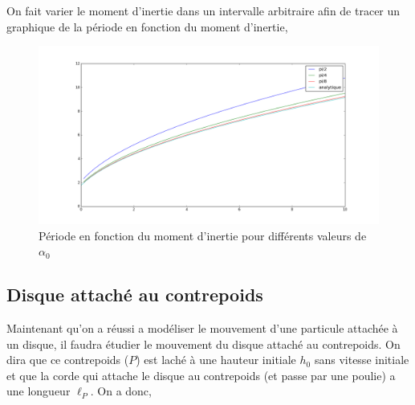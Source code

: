 \documentclass[10pt]{article}
\begin{document}
 On fait varier le moment d'inertie dans un intervalle arbitraire afin de tracer un graphique de la période en fonction du moment d'inertie,
 
 \begin{figure}[h]
  \centering
  \includegraphics[width=\textwidth]{../fig/T_I.png}
  \caption{Période en fonction du moment d'inertie pour différents valeurs de $\alpha_0$}
 \end{figure}


\pagebreak

\subsection{Disque attaché au contrepoids}

Maintenant qu'on a réussi a modéliser le mouvement d'une particule attachée à un disque, il faudra étudier le mouvement du disque
attaché au contrepoids. On dira que ce contrepoids ($P$) est laché à une hauteur initiale $h_0$ sans vitesse initiale et que la corde
qui attache le disque au contrepoids (et passe par une poulie) a une longueur $\ell_{P}$. On a donc,
\begin{center}
\end{center}
\end{document}

